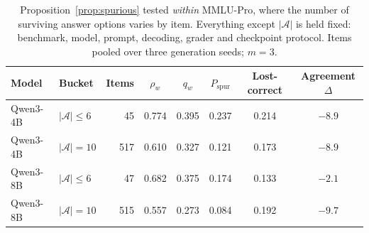 \documentclass[acmsmall]{acmart}
\newcommand{\up}[1]{\textcolor{gd}{#1}}
\theoremstyle{acmdefinition}%
\theoremstyle{acmplain}}{}%
\begin{document}
\begin{table}[t]
\caption{Proposition~\ref{prop:spurious} tested \emph{within} MMLU-Pro, where the number of surviving answer options varies by item. Everything except $|\mathcal{A}|$ is held fixed: benchmark, model, prompt, decoding, grader and checkpoint protocol. Items pooled over three generation seeds; $m=3$.}
\label{tab:within}
\small
\begin{tabular}{@{}llrccccc@{}}
\toprule
\textbf{Model} & \textbf{Bucket} & \textbf{Items} & $\rho_w$ & $q_w$ & $P_{\mathrm{spur}}$ & \textbf{Lost-correct} & \textbf{Agreement} $\Delta$ \\
\midrule
Qwen3-4B & $|\mathcal{A}| \leq 6$ & 45  & 0.774 & 0.395 & 0.237 & 0.214 & $-8.9$ \\
Qwen3-4B & $|\mathcal{A}| = 10$  & 517 & \up{0.610} & 0.327 & \up{0.121} & 0.173 & $-8.9$ \\
Qwen3-8B & $|\mathcal{A}| \leq 6$ & 47  & 0.682 & 0.375 & 0.174 & 0.133 & $-2.1$ \\
Qwen3-8B & $|\mathcal{A}| = 10$  & 515 & \up{0.557} & 0.273 & \up{0.084} & 0.192 & $-9.7$ \\
\bottomrule
\end{tabular}
\end{table}
\end{document}
